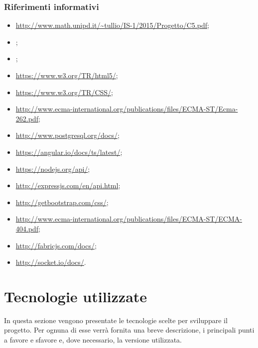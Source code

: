 \documentclass[a4paper, titlepage]{article}
\begin{document}
\subsubsection{Riferimenti informativi}
\begin{itemize}
\item {}  \url{http://www.math.unipd.it/~tullio/IS-1/2015/Progetto/C5.pdf};

\item {} \Gldoc;

\item {} \AdRdoc;

\item {} \url{https://www.w3.org/TR/html5/};

\item {} \url{https://www.w3.org/TR/CSS/};

\item {} \url{http://www.ecma-international.org/publications/files/ECMA-ST/Ecma-262.pdf};

\item {} \url{http://www.postgresql.org/docs/};

\item {} \url{https://angular.io/docs/ts/latest/};

\item {} \url{https://nodejs.org/api/};

\item {} \url{http://expressjs.com/en/api.html};

\item {} \url{http://getbootstrap.com/css/};

\item {} \url{http://www.ecma-international.org/publications/files/ECMA-ST/ECMA-404.pdf};

\item {} \url{http://fabricjs.com/docs/};

\item {} \url{http://socket.io/docs/}.

\end{itemize}

\newpage

\section{Tecnologie utilizzate}
In questa sezione vengono presentate le tecnologie scelte per sviluppare il progetto. Per ognuna di esse verrà fornita una breve descrizione, i principali punti a favore e sfavore e, dove necessario, la versione utilizzata.
\end{document}
